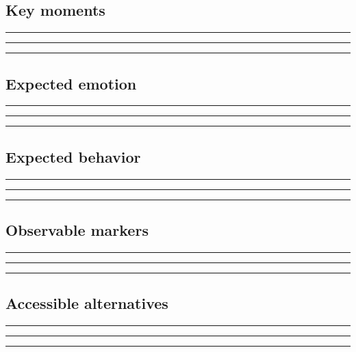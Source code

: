\documentclass[11pt]{article}
\begin{document}
\subsection{Key moments}
\noindent\rule{\linewidth}{0.3pt}\par\vspace{0.18in}
\noindent\rule{\linewidth}{0.3pt}\par\vspace{0.18in}
\noindent\rule{\linewidth}{0.3pt}\par\vspace{0.14in}

\subsection{Expected emotion}
\noindent\rule{\linewidth}{0.3pt}\par\vspace{0.18in}
\noindent\rule{\linewidth}{0.3pt}\par\vspace{0.18in}
\noindent\rule{\linewidth}{0.3pt}\par\vspace{0.14in}

\subsection{Expected behavior}
\noindent\rule{\linewidth}{0.3pt}\par\vspace{0.18in}
\noindent\rule{\linewidth}{0.3pt}\par\vspace{0.18in}
\noindent\rule{\linewidth}{0.3pt}\par\vspace{0.14in}

\subsection{Observable markers}
\noindent\rule{\linewidth}{0.3pt}\par\vspace{0.18in}
\noindent\rule{\linewidth}{0.3pt}\par\vspace{0.18in}
\noindent\rule{\linewidth}{0.3pt}\par\vspace{0.14in}

\subsection{Accessible alternatives}
\noindent\rule{\linewidth}{0.3pt}\par\vspace{0.18in}
\noindent\rule{\linewidth}{0.3pt}\par\vspace{0.18in}
\noindent\rule{\linewidth}{0.3pt}\par\vspace{0.14in}
\end{document}
